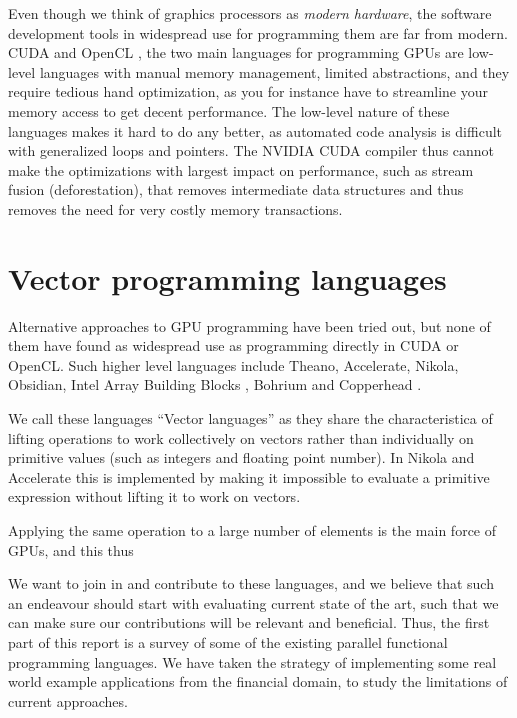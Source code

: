 Even though we think of graphics processors as \textit{modern
  hardware}, the software development tools in widespread use for
programming them are far from modern. CUDA
\cite{nvidia2012programming} and OpenCL \cite{munshi2011opencl}, the
two main languages for programming GPUs are low-level languages with
manual memory management, limited abstractions, and they require
tedious hand optimization, as you for instance have to streamline your
memory access to get decent performance. The low-level nature of these
languages makes it hard to do any better, as automated code analysis
is difficult with generalized loops and pointers. The NVIDIA CUDA
compiler thus cannot make the optimizations with largest impact on
performance, such as stream fusion (deforestation), that removes
intermediate data structures and thus removes the need for very costly
memory transactions.

\section{Vector programming languages}
Alternative approaches to GPU programming have been tried out, but
none of them have found as widespread use as programming directly in
CUDA or OpenCL. Such higher level languages include Theano\cite{bergstra2010theano},
Accelerate\cite{chakravarty2011accelerating},
Nikola\cite{mainland2010nikola}, Obsidian\cite{svensson2011obsidian},
Intel Array Building Blocks \cite{newburn2011intel}, Bohrium
\cite{homepage:bohrium} and Copperhead \cite{Catanzaro2011}.

We call these languages ``Vector languages'' as they share the
characteristica of lifting operations to work collectively on vectors
rather than individually on primitive values (such as integers and
floating point number). In Nikola and Accelerate this is implemented
by making it impossible to evaluate a primitive expression without
lifting it to work on vectors.

Applying the same operation to a large number of elements is the main
force of GPUs, and this thus 

We want to join in and contribute to these languages, and we believe
that such an endeavour should start with evaluating current state of
the art, such that we can make sure our contributions will be relevant
and beneficial. Thus, the first part of this report is a survey of
some of the existing parallel functional programming languages. We
have taken the strategy of implementing some real world example
applications from the financial domain, to study the limitations of
current approaches. 


